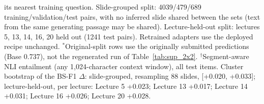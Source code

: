 \begin{table}[!htbp]
{its nearest training question. Slide-grouped split: 4039/479/689 training/validation/test
pairs, with no inferred slide shared between the sets (text from the same generating passage may be shared). Lecture-held-out
split: lectures 5, 13, 14, 16, 20 held out (1241 test pairs). Retrained adapters use the
deployed recipe unchanged. $^*$Original-split rows use the originally submitted predictions (Base 0.737), not the regenerated run
of Table~\ref{tab:sup_2x2}. $^\dagger$Segment-aware NLI entailment (any 1,024-character context window), all test items.
Cluster bootstrap of the BS-F1 $\Delta$: slide-grouped, resampling 88 slides, [+0.020, +0.033]; lecture-held-out,
per lecture: Lecture 5 +0.023; Lecture 13 +0.017; Lecture 14 +0.031; Lecture 16 +0.026; Lecture 20 +0.028.}
\end{table}
